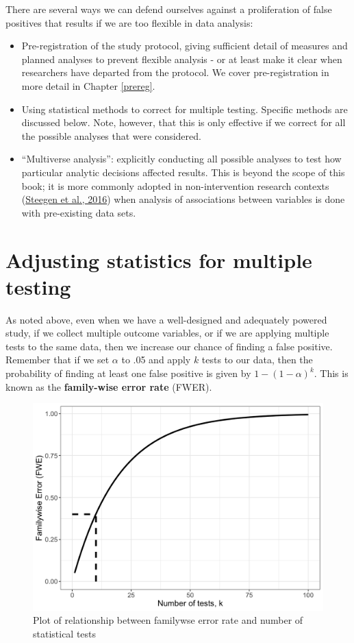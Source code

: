 \documentclass{krantz}
\begin{document}
There are several ways we can defend ourselves against a proliferation of false positives that results if we are too flexible in data analysis:

\begin{itemize}
\item
  Pre-registration of the study protocol, giving sufficient detail of measures and planned analyses to prevent flexible analysis - or at least make it clear when researchers have departed from the protocol. We cover pre-registration in more detail in Chapter \ref{prereg}.
\item
  Using statistical methods to correct for multiple testing. Specific methods are discussed below. Note, however, that this is only effective if we correct for all the possible analyses that were considered.
\item
  ``Multiverse analysis'': explicitly conducting all possible analyses to test how particular analytic decisions affected results. This is beyond the scope of this book; it is more commonly adopted in non-intervention research contexts (\protect\hyperlink{ref-steegen2016}{Steegen et al., 2016}) when analysis of associations between variables is done with pre-existing data sets.
\end{itemize}

\hypertarget{adjusting-statistics-for-multiple-testing}{%
\section{Adjusting statistics for multiple testing}\label{adjusting-statistics-for-multiple-testing}}

As noted above, even when we have a well-designed and adequately powered study, if we collect multiple outcome variables, or if we are applying multiple tests to the same data, then we increase our chance of finding a false positive. Remember that if we set \(\alpha\) to .05 and apply \(k\) tests to our data, then the probability of finding at least one false positive is given by \(1-(1-\alpha)^{k}\). This is known as the \textbf{family-wise error rate} (FWER).

\begin{figure}
\includegraphics[width=0.8\linewidth]{images_bw/familywise} \caption{Plot of relationship between familywse error rate and number of statistical tests}\label{fig:familywise}
\end{figure}
\end{document}
